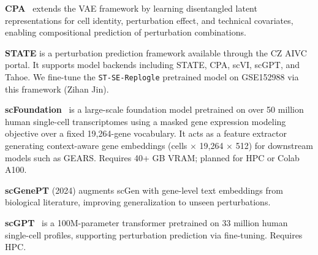 \documentclass[11pt,letterpaper]{article}
\begin{document}
\textbf{CPA}~\cite{lotfollahi2021} extends the VAE framework by learning disentangled latent
representations for cell identity, perturbation effect, and technical covariates, enabling
compositional prediction of perturbation combinations.

\textbf{STATE} is a perturbation prediction framework available through the CZ AIVC portal. It
supports model backends including STATE, CPA, scVI, scGPT, and Tahoe. We fine-tune the
\texttt{ST-SE-Replogle} pretrained model on GSE152988 via this framework (Zihan Jin).

\textbf{scFoundation}~\cite{hao2024} is a large-scale foundation model pretrained on over 50
million human single-cell transcriptomes using a masked gene expression modeling objective over a
fixed 19,264-gene vocabulary. It acts as a feature extractor generating context-aware gene
embeddings (cells $\times$ 19,264 $\times$ 512) for downstream models such as GEARS. Requires
40+ GB VRAM; planned for HPC or Colab A100.

\textbf{scGenePT} (2024) augments scGen with gene-level text embeddings from biological
literature, improving generalization to unseen perturbations.

\textbf{scGPT}~\cite{cui2024} is a 100M-parameter transformer pretrained on 33 million human
single-cell profiles, supporting perturbation prediction via fine-tuning. Requires HPC.
\end{document}
